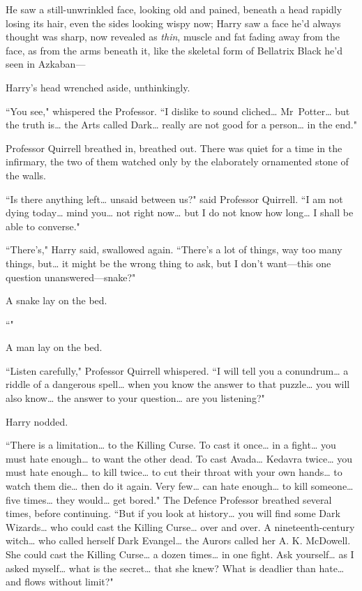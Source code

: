 He saw a still-unwrinkled face, looking old and pained, beneath a head rapidly losing its hair, even the sides looking wispy now; Harry saw a face he'd always thought was sharp, now revealed as \emph{thin}, muscle and fat fading away from the face, as from the arms beneath it, like the skeletal form of Bellatrix Black he'd seen in Azkaban—

Harry's head wrenched aside, unthinkingly.

``You see," whispered the Professor. ``I dislike to sound cliched{\ldots} Mr~Potter{\ldots} but the truth is{\ldots} the Arts called Dark{\ldots} really are not good for a person{\ldots} in the end."

Professor Quirrell breathed in, breathed out. There was quiet for a time in the infirmary, the two of them watched only by the elaborately ornamented stone of the walls.

``Is there anything left{\ldots} unsaid between us?" said Professor Quirrell. ``I am not dying today{\ldots} mind you{\ldots} not right now{\ldots} but I do not know how long{\ldots} I shall be able to converse."

``There's," Harry said, swallowed again. ``There's a lot of things, way too many things, but{\ldots} it might be the wrong thing to ask, but I don't want—this one question unanswered—snake?"

A snake lay on the bed.

``"

A man lay on the bed.

``Listen carefully," Professor Quirrell whispered. ``I will tell you a conundrum{\ldots} a riddle of a dangerous spell{\ldots} when you know the answer to that puzzle{\ldots} you will also know{\ldots} the answer to your question{\ldots} are you listening?"

Harry nodded.

``There is a limitation{\ldots} to the Killing Curse. To cast it once{\ldots} in a fight{\ldots} you must hate enough{\ldots} to want the other dead. To cast Avada{\ldots} Kedavra twice{\ldots} you must hate enough{\ldots} to kill twice{\ldots} to cut their throat with your own hands{\ldots} to watch them die{\ldots} then do it again. Very few{\ldots} can hate enough{\ldots} to kill someone{\ldots} five times{\ldots} they would{\ldots} get bored." The Defence Professor breathed several times, before continuing. ``But if you look at history{\ldots} you will find some Dark Wizards{\ldots} who could cast the Killing Curse{\ldots} over and over. A nineteenth-century witch{\ldots} who called herself Dark Evangel{\ldots} the Aurors called her A. K. McDowell. She could cast the Killing Curse{\ldots} a dozen times{\ldots} in one fight. Ask yourself{\ldots} as I asked myself{\ldots} what is the secret{\ldots} that she knew? What is deadlier than hate{\ldots} and flows without limit?"

